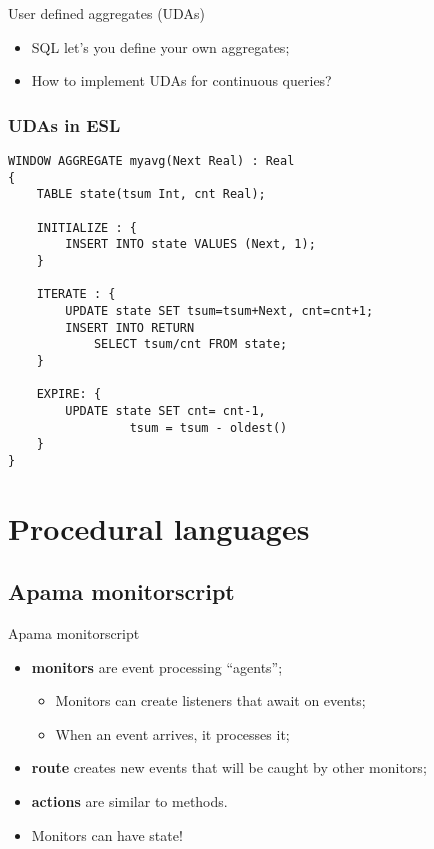 \documentclass[brown, compress, mathserif]{beamer}
\begin{document}
\begin{frame}{User defined aggregates (UDAs)}
  \begin{itemize}
  \item SQL let's you define your own aggregates;
  \item How to implement UDAs for continuous queries?
  \end{itemize}
\end{frame}


\begin{frame}[fragile]
  \frametitle{UDAs in ESL}
  \begin{footnotesize}
    \begin{verbatim}
WINDOW AGGREGATE myavg(Next Real) : Real
{
    TABLE state(tsum Int, cnt Real);

    INITIALIZE : {
        INSERT INTO state VALUES (Next, 1);
    }

    ITERATE : {
        UPDATE state SET tsum=tsum+Next, cnt=cnt+1;
        INSERT INTO RETURN
            SELECT tsum/cnt FROM state;
    }

    EXPIRE: {
        UPDATE state SET cnt= cnt-1,
                 tsum = tsum - oldest()
    }
}
\end{verbatim}
  \end{footnotesize}
\end{frame}

\section{Procedural languages}

\subsection{Apama monitorscript}


\begin{frame}{Apama monitorscript}
  \begin{itemize}
  \item \textbf{monitors} are event processing ``agents'';
    \begin{itemize}
    \item Monitors can create listeners that await on events;
    \item When an event arrives, it processes it;
    \end{itemize}
  \item \textbf{route} creates new events that will be caught by other monitors;
  \item \textbf{actions} are similar to methods.
  \item Monitors can have state!
  \end{itemize}
\end{frame}
\end{document}
